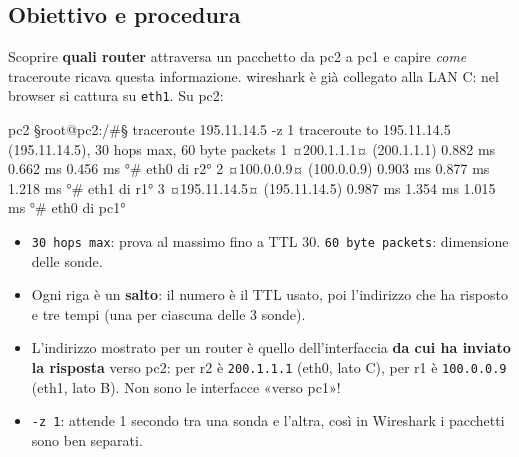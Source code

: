 
\subsection{Obiettivo e procedura}
Scoprire \textbf{quali router} attraversa un pacchetto da pc2 a pc1 e capire \emph{come} traceroute ricava questa informazione. wireshark è già collegato alla LAN C: nel browser si cattura su \texttt{eth1}. Su pc2:
\begin{terminale}{pc2}
§root@pc2:/#§ traceroute 195.11.14.5 -z 1
traceroute to 195.11.14.5 (195.11.14.5), 30 hops max, 60 byte packets
 1  ¤200.1.1.1¤ (200.1.1.1)  0.882 ms  0.662 ms  0.456 ms      °# eth0 di r2°
 2  ¤100.0.0.9¤ (100.0.0.9)  0.903 ms  0.877 ms  1.218 ms      °# eth1 di r1°
 3  ¤195.11.14.5¤ (195.11.14.5)  0.987 ms  1.354 ms  1.015 ms  °# eth0 di pc1°
\end{terminale}
\begin{esempio}
\begin{itemize}
  \item \texttt{30 hops max}: prova al massimo fino a TTL 30. \texttt{60 byte packets}: dimensione delle sonde.
  \item Ogni riga è un \textbf{salto}: il numero è il TTL usato, poi l'indirizzo che ha risposto e tre tempi (una per ciascuna delle 3 sonde).
  \item L'indirizzo mostrato per un router è quello dell'interfaccia \textbf{da cui ha inviato la risposta} verso pc2: per r2 è \texttt{200.1.1.1} (eth0, lato C), per r1 è \texttt{100.0.0.9} (eth1, lato B). Non sono le interfacce «verso pc1»!
  \item \texttt{-z 1}: attende 1 secondo tra una sonda e l'altra, così in Wireshark i pacchetti sono ben separati.
\end{itemize}
\end{esempio}

